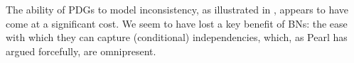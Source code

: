 \documentclass{article}
\theoremstyle{plain}
\theoremstyle{definition}
\theoremstyle{remark}
\numberwithin{equation}{section}
\begin{document}
The ability of PDGs to model inconsistency, as illustrated in
, appears to have come at a significant cost. We seem
to have lost a key benefit of BNs: the ease with which they can
capture
(conditional) independencies, which, as Pearl \cite{pearl1989conditional} has
argued forcefully, are omnipresent.


	
\end{document}
